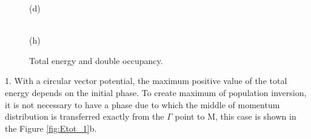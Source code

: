 \begin{figure}[h!]
\begin{minipage}[h]{0.5\linewidth}
 (d) \\
\end{minipage}
\hfill
\begin{minipage}[h]{0.5\linewidth}
 \\(h)
\end{minipage}


\caption{Total energy and double occupancy.}
\label{fig:Etot_5}
\end{figure}

\clearpage



1. With a circular vector potential, the maximum positive value of the total energy depends on the initial phase. To create maximum of population inversion, it is not necessary to have a phase due to which the middle of momentum distribution is transferred exactly from the $\Gamma$ point to M, this case is shown in the Figure \ref{fig:Etot_1}b.


